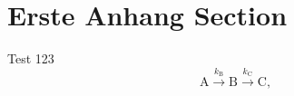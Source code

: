 \section{Erste Anhang Section}
Test 123
\begin{equation}
\mathrm{A} \xrightarrow{k_{\mathrm{B}}} \mathrm{B} \xrightarrow{k_{\mathrm{C}}} \mathrm{C},
\end{equation}